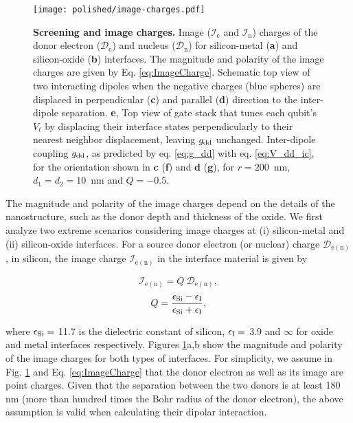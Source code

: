 \begin{figure}
\centering
\texttt{[image: polished/image-charges.pdf]}
\caption[Screening and image charges]{\textbf{Screening and image charges.} Image ($\mathcal{I}_\mathrm{e}$ and $\mathcal{I}_\mathrm{n}$) charges of the donor electron ($\mathcal{D}_\mathrm{e}$) and nucleus ($\mathcal{D}_\mathrm{n}$) for silicon-metal (\textbf{a}) and silicon-oxide (\textbf{b}) interfaces. The magnitude and polarity of the image charges are given by Eq. \ref{eq:ImageCharge}. Schematic top view of two interacting dipoles when the negative charges (blue spheres) are displaced in perpendicular (\textbf{c}) and parallel (\textbf{d}) direction to the inter-dipole separation. \textbf{e}, Top view of gate stack that tunes each qubit's $V_t$ by displacing their interface states perpendicularly to their nearest neighbor displacement, leaving $g_{\rm dd}$ unchanged. Inter-dipole coupling $g_{\rm dd}$, as predicted by eq. \eqref{eq:g_dd} with eq. \eqref{eq:V_dd_ic}, for the orientation shown in \textbf{c} (\textbf{f}) and \textbf{d} (\textbf{g}), for $r=200$~nm, $d_1=d_2=10$~nm and $Q=-0.5$.}
\label{fig:image_charge}
\end{figure}

The magnitude and polarity of the image charges depend on the details of the nanostructure, such as the donor depth and thickness of the oxide. We first analyze two extreme scenarios considering image charges at (i) silicon-metal and (ii) silicon-oxide interfaces. For a source donor electron (or nuclear) charge $\mathcal{D}_\mathrm{e(n)}$, in silicon, the image charge $\mathcal{I}_\mathrm{e(n)}$ in the interface material is given by\cite{Rahman2009}

\begin{equation} \label{eq:ImageCharge}
\mathcal{I}_\mathrm{e(n)}=Q~\mathcal{D}_\mathrm{e(n)},
\end{equation}
\begin{equation} \label{eq:Q}
Q=\frac{\epsilon_{\rm Si} - \epsilon_{\rm I}}{\epsilon_{\rm Si} + \epsilon_{\rm I}},
\end{equation}

where $\epsilon_{\rm Si} =$ 11.7 is the dielectric constant of silicon,  $\epsilon_{\rm I} =$ 3.9 and  $\infty$  for oxide and metal interfaces respectively. Figures \ref{fig:image_charge}a,b show the magnitude and polarity of the image charges for both types of interfaces. For simplicity, we assume in Fig. \ref{fig:image_charge} and Eq. \ref{eq:ImageCharge} that the donor electron as well as its image are point charges. Given that the separation between the two donors is at least 180 nm (more than hundred times the Bohr radius of the donor electron), the above assumption is valid when calculating their dipolar interaction. 

